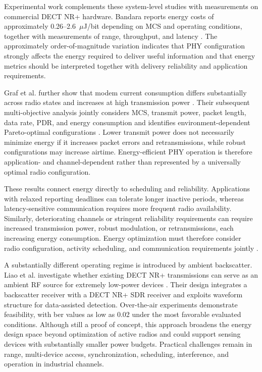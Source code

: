 Experimental work complements these system-level studies with measurements on commercial DECT NR+ hardware. Bandara reports energy costs of approximately 0.26--2.6~$\mu$J/bit depending on MCS and operating conditions, together with measurements of range, throughput, and latency \cite{bandaraExperimentalValidationAnalysis2025}. The approximately order-of-magnitude variation indicates that PHY configuration strongly affects the energy required to deliver useful information and that energy metrics should be interpreted together with delivery reliability and application requirements.

Graf et al. further show that modem current consumption differs substantially across radio states and increases at high transmission power \cite{grafWhatExpectWhen2026}. Their subsequent multi-objective analysis jointly considers MCS, transmit power, packet length, data rate, PDR, and energy consumption and identifies environment-dependent Pareto-optimal configurations \cite{grafParetoOptimalityApproach2026a}. Lower transmit power does not necessarily minimize energy if it increases packet errors and retransmissions, while robust configurations may increase airtime. Energy-efficient PHY operation is therefore application- and channel-dependent rather than represented by a universally optimal radio configuration.

These results connect energy directly to scheduling and reliability. Applications with relaxed reporting deadlines can tolerate longer inactive periods, whereas latency-sensitive communication requires more frequent radio availability. Similarly, deteriorating channels or stringent reliability requirements can require increased transmission power, robust modulation, or retransmissions, each increasing energy consumption. Energy optimization must therefore consider radio configuration, activity scheduling, and communication requirements jointly \cite{nihtilaEnergyConsumptionDECT20202022, bandaraExperimentalValidationAnalysis2025, grafParetoOptimalityApproach2026a}.

A substantially different operating regime is introduced by ambient backscatter. Liao et al. investigate whether existing DECT NR+ transmissions can serve as an ambient RF source for extremely low-power devices \cite{liaoDataAssistedBackscatter2025}. Their design integrates a backscatter receiver with a DECT NR+ SDR receiver and exploits waveform structure for data-assisted detection. Over-the-air experiments demonstrate feasibility, with \gls{ber} values as low as 0.02 under the most favorable evaluated conditions. Although still a proof of concept, this approach broadens the energy design space beyond optimization of active radios and could support sensing devices with substantially smaller power budgets. Practical challenges remain in range, multi-device access, synchronization, scheduling, interference, and operation in industrial channels.

